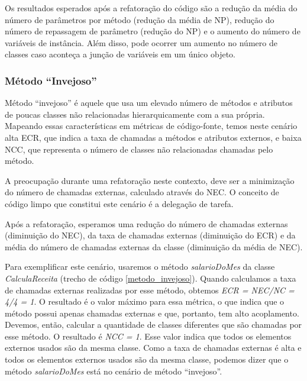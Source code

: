 Os resultados esperados após a refatoração do código são a redução da média do número de parâmetros por método (redução da média de NP), redução do número de repassagem de parâmetro (redução do NP) e o aumento do número de variáveis de instância. Além disso, pode ocorrer um aumento no número de classes caso aconteça a junção de variáveis em um único objeto.	           


\subsubsection{Método ``Invejoso''}
	
Método ``invejoso'' é aquele que usa um elevado número de métodos e atributos de poucas classes não relacionadas hierarquicamente com a sua própria. Mapeando essas características em métricas de código-fonte, temos neste cenário alta ECR, que indica a taxa de chamadas a métodos e atributos externos, e baixa NCC, que representa o número de classes não relacionadas chamadas pelo método.
	
A preocupação durante uma refatoração neste contexto, deve ser a minimização do número de chamadas externas, calculado através do NEC. O conceito de código limpo que constitui este cenário é a delegação de tarefa.
	
Após a refatoração, esperamos uma redução do número de chamadas externas (diminuição do NEC), da taxa de chamadas externas (diminuição do ECR) e da média do número de chamadas externas da classe (diminuição da média de NEC).
                      
Para exemplificar este cenário, usaremos o método \textit{salarioDoMes} da classe \textit{CalculaReceita} (trecho de código \ref{metodo_invejoso}). Quando calculamos a taxa de chamadas externas realizadas por esse método, obtemos \textit{ECR = NEC/NC = 4/4 = 1}. O resultado é o valor máximo para essa métrica, o que indica que o método possui apenas chamadas externas e que, portanto, tem alto acoplamento. Devemos, então, calcular a quantidade de classes diferentes que são chamadas por esse método. O resultado é \textit{NCC = 1}. Esse valor indica que todos os elementos externos usados são da mesma classe. Como a taxa de chamadas externas é alta e todos os elementos externos usados são da mesma classe, podemos dizer que o método \textit{salarioDoMes} está no cenário de método ``invejoso''.

                                      

